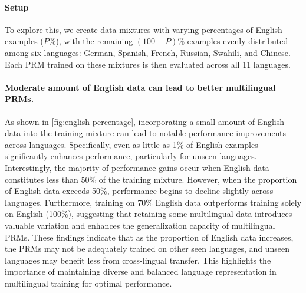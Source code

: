\paragraph{Setup}

To explore this, we create data mixtures with varying percentages of English examples ($P\%$), with the remaining $(100 - P)\%$ examples evenly distributed among six languages: German, Spanish, French, Russian, Swahili, and Chinese. 
Each PRM trained on these mixtures is then evaluated across all 11 languages.



\paragraph{Moderate amount of English data can lead to better multilingual PRMs.}
As shown in \autoref{fig:english-percentage}, incorporating a small amount of English data into the training mixture can lead to notable performance improvements across languages. Specifically, even as little as 1\% of English examples significantly enhances performance, particularly for unseen languages. Interestingly, the majority of performance gains occur when English data constitutes less than 50\% of the training mixture. However, when the proportion of English data exceeds 50\%, performance begins to decline slightly across languages. Furthermore, training on 70\% English data outperforms training solely on English (100\%), suggesting that retaining some multilingual data introduces valuable variation and enhances the generalization capacity of multilingual PRMs. These findings indicate that as the proportion of English data increases, the PRMs may not be adequately trained on other seen languages, and unseen languages may benefit less from cross-lingual transfer. This highlights the importance of maintaining diverse and balanced language representation in multilingual training for optimal performance.

